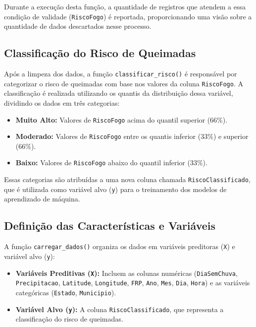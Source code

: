 Durante a execução desta função, a quantidade de registros que atendem a essa condição de validade (\texttt{RiscoFogo}) é reportada, proporcionando uma visão sobre a quantidade de dados descartados nesse processo.

\subsection{Classificação do Risco de Queimadas}

Após a limpeza dos dados, a função \texttt{classificar\_risco()} é responsável por categorizar o risco de queimadas com base nos valores da coluna \texttt{RiscoFogo}. A classificação é realizada utilizando os quantis da distribuição dessa variável, dividindo os dados em três categorias:

\begin{itemize}
    \item \textbf{Muito Alto:} Valores de \texttt{RiscoFogo} acima do quantil superior (66\%).
    \item \textbf{Moderado:} Valores de \texttt{RiscoFogo} entre os quantis inferior (33\%) e superior (66\%).
    \item \textbf{Baixo:} Valores de \texttt{RiscoFogo} abaixo do quantil inferior (33\%).
\end{itemize}

Essas categorias são atribuídas a uma nova coluna chamada \texttt{RiscoClassificado}, que é utilizada como variável alvo (\texttt{y}) para o treinamento dos modelos de aprendizado de máquina.

\subsection{Definição das Características e Variáveis}

A função \texttt{carregar\_dados()} organiza os dados em variáveis preditoras (\texttt{X}) e variável alvo (\texttt{y}):

\begin{itemize}
    \item \textbf{Variáveis Preditivas (\texttt{X}):} Incluem as colunas numéricas (\texttt{DiaSemChuva}, \texttt{Precipitacao}, \texttt{Latitude}, \texttt{Longitude}, \texttt{FRP}, \texttt{Ano}, \texttt{Mes}, \texttt{Dia}, \texttt{Hora}) e as variáveis categóricas (\texttt{Estado}, \texttt{Municipio}).
    \item \textbf{Variável Alvo (\texttt{y}):} A coluna \texttt{RiscoClassificado}, que representa a classificação do risco de queimadas.
\end{itemize}

